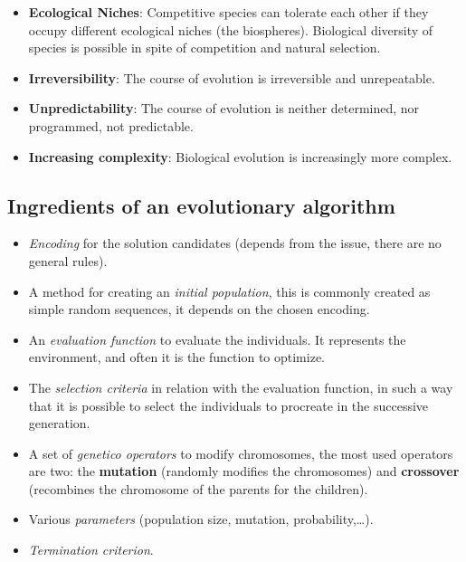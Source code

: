 \documentclass{article}
\begin{document}
\begin{itemize}
    \item \textbf{Ecological Niches}: Competitive species can tolerate each other if they occupy different
          ecological niches (the biospheres). Biological diversity of species is possible in spite of competition
          and natural selection.
    \item \textbf{Irreversibility}: The course of evolution is irreversible and unrepeatable.
    \item \textbf{Unpredictability}: The course of evolution is neither determined, nor programmed, not predictable.
    \item \textbf{Increasing complexity}: Biological evolution is increasingly more complex.
\end{itemize}

\subsection{Ingredients of an evolutionary algorithm}
\begin{itemize}
    \item \textit{Encoding} for the solution candidates (depends from the issue, there are no
          general rules).
    \item A method for creating an \textit{initial population}, this is commonly created
          as simple random sequences, it depends on the chosen encoding.
    \item An \textit{evaluation function} to evaluate the individuals. It represents the
          environment, and often it is the function to optimize.
    \item The \textit{selection criteria} in relation with the evaluation function,
          in such a way that it is possible to select the individuals to procreate in the
          successive generation.
    \item A set of \textit{genetico operators} to modify chromosomes, the most used
          operators are two: the \textbf{mutation} (randomly modifies the
          chromosomes) and \textbf{crossover} (recombines the chromosome of the parents for
          the children).
    \item Various \textit{parameters} (population size, mutation, probability,\dots).
    \item \textit{Termination criterion}.
\end{itemize}
\end{document}
